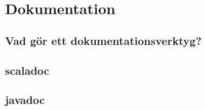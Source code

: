 
\chapter{Dokumentation}

\section{Vad gör ett dokumentationsverktyg?}

\section{scaladoc}

\section{javadoc}